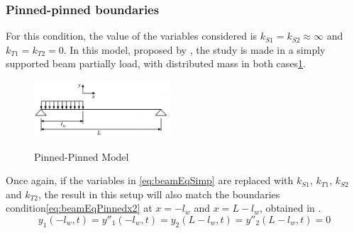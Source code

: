     \subsubsection{Pinned-pinned boundaries}
    For this condition, the value of the variables considered is $k_{S1}=k_{S2}\approx\infty$ and $k_{T1}=k_{T2}=0$. In this model, proposed by \citeauthor{chanFREEVIBRATIONSIMPLY1996}, the study is made in a simply supported beam partially load, with distributed mass in both cases\ref{fig:pinnedpinnedmodel}.
    \begin{figure}[!htb]
        \centering
        \includegraphics[width=0.45\textwidth]{Chapters/2CHP/Diagrams/pinnedpinnedmodel.pdf}
        \caption{Pinned-Pinned Model}{\cite{chanFREEVIBRATIONSIMPLY1996}}
        \label{fig:pinnedpinnedmodel}
    \end{figure}
    Once again, if the variables in \ref{eq:beamEqSimp} are replaced with $k_{S1}$, $k_{T1}$, $k_{S2}$ and $k_{T2}$, the result in this setup will also match the boundaries condition\ref{eq:beamEqPinnedx2} at $x=-l_w$ and $x=L-l_w$, obtained in \cite{chanFREEVIBRATIONSIMPLY1996}.
    \begin{equation} \label{eq:beamEqPinnedx2}
        y_1(-l_w,t) = y''_1(-l_w,t) = y_2(L-l_w,t) = y''_2(L-l_w,t)=0
    \end{equation}
